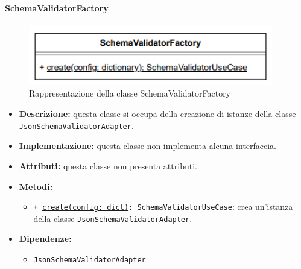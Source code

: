 \paragraph{SchemaValidatorFactory} \label{SchemaValidatorFactory}
\begin{figure}[H]
    \centering
    \includegraphics[width=0.95\textwidth]{assets/Backend/schema_validator_factory.png}
    \caption{Rappresentazione della classe SchemaValidatorFactory}
  \end{figure}
\begin{itemize}
    \item \textbf{Descrizione:} questa classe si occupa della creazione di istanze della classe \texttt{JsonSchemaValidatorAdapter}.
    \item \textbf{Implementazione:} questa classe non implementa alcuna interfaccia.
    \item \textbf{Attributi:} questa classe non presenta attributi.
    \item \textbf{Metodi:}
    \begin{itemize}
        \item \texttt{+ \underline{create(config: dict)}: SchemaValidatorUseCase}: crea un'istanza della classe \texttt{JsonSchemaValidatorAdapter}.
    \end{itemize}
    \item \textbf{Dipendenze:}
    \begin{itemize}
        \item \texttt{JsonSchemaValidatorAdapter}
    \end{itemize}
\end{itemize}  


